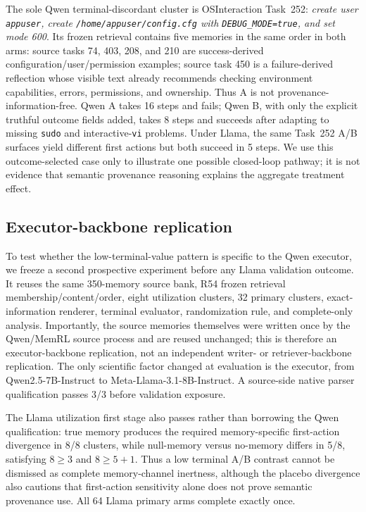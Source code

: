 The sole Qwen terminal-discordant cluster is OSInteraction Task~252: \emph{create user \texttt{appuser}, create \texttt{/home/appuser/config.cfg} with \texttt{DEBUG\_MODE=true}, and set mode 600}. Its frozen retrieval contains five memories in the same order in both arms: source tasks 74, 403, 208, and 210 are success-derived configuration/user/permission examples; source task 450 is a failure-derived reflection whose visible text already recommends checking environment capabilities, errors, permissions, and ownership. Thus A is not provenance-information-free. Qwen A takes 16 steps and fails; Qwen B, with only the explicit truthful outcome fields added, takes 8 steps and succeeds after adapting to missing \texttt{sudo} and interactive-\texttt{vi} problems. Under Llama, the same Task~252 A/B surfaces yield different first actions but both succeed in 5 steps. We use this outcome-selected case only to illustrate one possible closed-loop pathway; it is not evidence that semantic provenance reasoning explains the aggregate treatment effect.

\subsection{Executor-backbone replication}
\label{sec:l2replication}
To test whether the low-terminal-value pattern is specific to the Qwen executor, we freeze a second prospective experiment before any Llama validation outcome. It reuses the same 350-memory source bank, R54 frozen retrieval membership/content/order, eight utilization clusters, 32 primary clusters, exact-information renderer, terminal evaluator, randomization rule, and complete-only analysis. Importantly, the source memories themselves were written once by the Qwen/MemRL source process and are reused unchanged; this is therefore an executor-backbone replication, not an independent writer- or retriever-backbone replication. The only scientific factor changed at evaluation is the executor, from Qwen2.5-7B-Instruct to Meta-Llama-3.1-8B-Instruct. A source-side native parser qualification passes 3/3 before validation exposure.

The Llama utilization first stage also passes rather than borrowing the Qwen qualification: true memory produces the required memory-specific first-action divergence in 8/8 clusters, while null-memory versus no-memory differs in 5/8, satisfying $8\geq3$ and $8\geq5+1$. Thus a low terminal A/B contrast cannot be dismissed as complete memory-channel inertness, although the placebo divergence also cautions that first-action sensitivity alone does not prove semantic provenance use. All 64 Llama primary arms complete exactly once.

